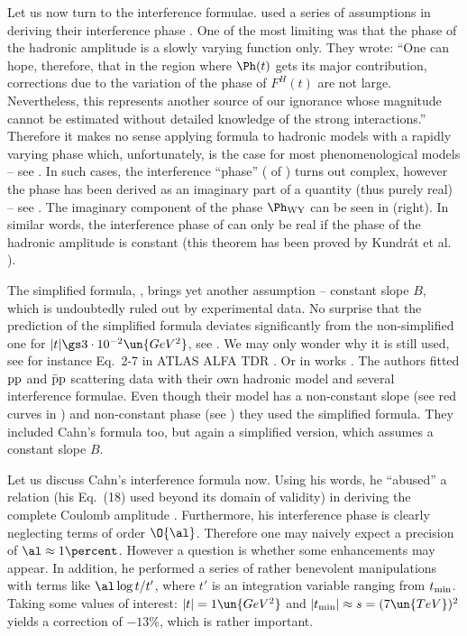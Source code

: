
Let us now turn to the interference formulae. \WaY{} used a series of assumptions in deriving their interference phase . One of the most limiting was that the phase of the hadronic amplitude is a slowly varying function only. They wrote: ``One can hope, therefore, that in the region where $\Ph(t)$ gets its major contribution, corrections due to the variation of the phase of $F^H(t)$ are not large. Nevertheless, this represents another source of our ignorance whose magnitude cannot be estimated without detailed knowledge of the strong interactions.'' Therefore it makes no sense applying \WaY{} formula to hadronic models with a rapidly varying phase which, unfortunately, is the case for most phenomenological models -- see . In such cases, the interference ``phase'' (\rhs{} of ) turns out complex, however the phase has been derived as an imaginary part of a quantity (thus purely real) -- see . The imaginary component of the phase $\Ph_{\rm WY}$ can be seen in  (right). In similar words, the interference phase of \WaY{} can only be real if the phase of the hadronic amplitude is constant (this theorem has been proved by Kundr\' at et al. ).

The simplified \WaY{} formula, , brings yet another assumption -- constant slope $B$, which is undoubtedly ruled out by experimental data. No surprise that the prediction of the simplified formula deviates significantly from the non-simplified one for $|t| \gs 3\cdot 10^{-2}\un{GeV^2}$, see . We may only wonder why it is still used, see for instance Eq.~2-7 in ATLAS ALFA TDR .
Or in works . The authors fitted $\rm pp$ and $\rm\bar pp$ scattering data with their own hadronic model and several interference formulae. Even though their model has a non-constant slope (see red curves in ) and non-constant phase (see ) they used the simplified \WY{} formula. They included Cahn's formula too, but again a simplified version, which assumes a constant slope $B$.


Let us discuss Cahn's interference formula  now. Using his words, he ``abused'' a relation (his Eq.~(18) used beyond its domain of validity) in deriving the complete Coulomb amplitude . Furthermore, his interference phase is clearly neglecting terms of order $\O{\al}$. Therefore one may naively expect a precision of $\al\approx 1\percent$. However a question is whether some enhancements may appear. In addition, he performed a series of rather benevolent manipulations with terms like $\al \log t/ t'$, where $t'$ is an integration variable ranging from $t_{\rm min}$. Taking some values of interest: $|t| = 1\un{GeV^2}$ and $|t_{\rm min}| \approx s = (7\un{TeV})^2$ yields a correction of $-13\percent$, which is rather important.

